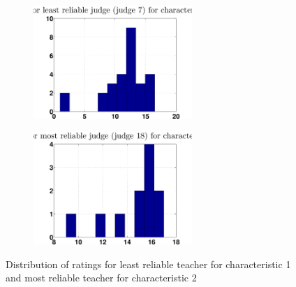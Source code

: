 \documentclass[12pt,a4paper]{article}
\begin{document}
\begin{figure}[!h]
\centering
\begin{subfigure}[b]{0.48\textwidth}
\includegraphics[width = 6cm]{noPreprocess/distribLeastRelK660c1.eps}
\end{subfigure}
\begin{subfigure}[b]{0.48\textwidth}
\includegraphics[width = 6cm]{noPreprocess/distribMostRelK660c2.eps}
\end{subfigure}
\caption{\label{hlhist}Distribution of ratings for least reliable teacher for characteristic 1 and most reliable teacher for characteristic 2}
\end{figure}
\end{document}

